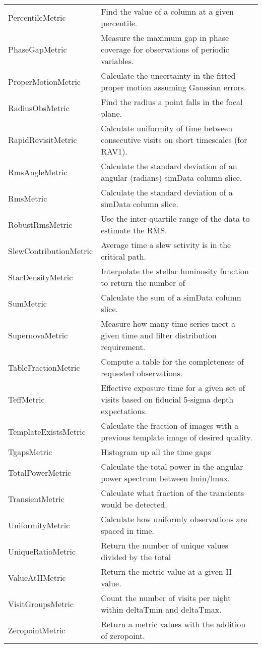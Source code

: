 \begin{table}
\begin{tabular}{ll}
 PercentileMetric &  Find the value of a column at a given percentile. \\
 PhaseGapMetric &  Measure the maximum gap in phase coverage for observations of periodic variables. \\
 ProperMotionMetric &  Calculate the uncertainty in the fitted proper motion assuming Gaussian errors. \\
 RadiusObsMetric &  Find the radius a point falls in the focal plane. \\
 RapidRevisitMetric &  Calculate uniformity of time between consecutive visits on short timescales (for RAV1). \\
 RmsAngleMetric &  Calculate the standard deviation of an angular (radians) simData column slice. \\
 RmsMetric &  Calculate the standard deviation of a simData column slice. \\
 RobustRmsMetric &  Use the inter-quartile range of the data to estimate the RMS. \\
 SlewContributionMetric &  Average time a slew sctivity is in the critical path. \\
 StarDensityMetric &  Interpolate the stellar luminosity function to return the number of \\
 SumMetric &  Calculate the sum of a simData column slice. \\
 SupernovaMetric &  Measure how many time series meet a given time and filter distribution requirement. \\
 TableFractionMetric &  Compute a table for the completeness of requested observations. \\
 TeffMetric &  Effective exposure time for a given set of visits based on fiducial 5-sigma depth expectations. \\
 TemplateExistsMetric &  Calculate the fraction of images with a previous template image of desired quality. \\
 TgapsMetric &  Histogram up all the time gaps  \\
 TotalPowerMetric &  Calculate the total power in the angular power spectrum between lmin/lmax. \\
 TransientMetric &  Calculate what fraction of the transients would be detected. \\
 UniformityMetric &  Calculate how uniformly observations are spaced in time. \\
 UniqueRatioMetric &  Return the number of unique values divided by the total \\
 ValueAtHMetric &  Return the metric value at a given H value. \\
 VisitGroupsMetric &  Count the number of visits per night within deltaTmin and deltaTmax. \\
 ZeropointMetric &  Return a metric values with the addition of zeropoint. \\
\hline
\end{tabular}

 \end{table}